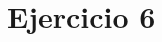 \documentclass[../../labo_tp5_main.tex]{subfiles}
\begin{document}
\section{Ejercicio 6}
\end{document}
